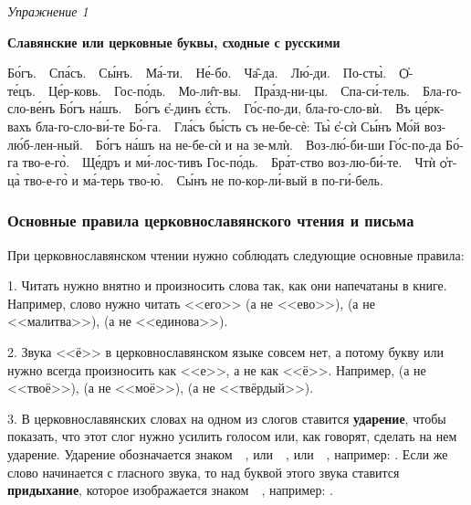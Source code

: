\documentclass[11pt,a4paper,oneside]{memoir}
\begin{document}
    \begin{flushright}
        \emph{Упражнение 1}
    \end{flushright}
    \medskip
    
    \textbf{Славянские или церковные буквы, сходные с русскими}
    
    {}
    \medskip
    
    \begin{center}
        \begin{slv}
            Бо́гъ.~\textemdash~Спа́съ.~\textemdash~Сы́нъ.~\textemdash~Ма́-ти.~\textemdash~Не́-бо.~\textemdash~Ча̑-да.~\textemdash~Лю́-ди.~\textemdash~По-сты̀.~\textemdash~Ѻ҆-те́цъ.~\textemdash~Це́р-ковь.~\textemdash~Гос-по́дь.~\textemdash~Мо-ли̑т-вы.~\textemdash~Пра́зд-ни-цы.~\textemdash~Спа-си́-тель.~\textemdash~Бла-го-сло-ве́нъ Бо́гъ на́шъ.~\textemdash~Бо́гъ є҆-динъ є҆́сть.~\textemdash~Го́с-по-ди, бла-го-сло-вѝ.~\textemdash~Въ це́рк-вахъ бла-го-сло-ви́-те Бо́-га.~\textemdash~Гла́съ бы́сть съ не-бе-сѐ: Ты̀ є҆-сѝ Сы́нъ Мо́й воз-лю́б-лен-ный.~\textemdash~Бо́гъ на́шъ на не-бе-сѝ и на зе-млѝ.~\textemdash~Воз-лю́-би-ши Го́с-по-да Бо́-га тво-е-го̀.~\textemdash~Ще́дръ и ми́-лос-тивъ Гос-по́дь.~\textemdash~Бра́т-ство воз-лю-би́-те.~\textemdash~Чтѝ ѻ҆т-ца̀ тво-е-го̀ и ма́-терь тво-ю̀.~\textemdash~Сы́нъ не по-кор-ли́-вый в по-ги́-бель.
        \end{slv}
    \end{center}


                \subsubsection{Основные правила церковнославянского чтения и письма}
                
    При церковнославянском чтении нужно соблюдать следующие основные правила:
    
    1. Читать нужно внятно и произносить слова так, как они напечатаны в книге. Например, слово {} нужно читать <<его>> (а не <<ево>>), {} (а не <<малитва>>), {} (а не <<единова>>).
    
    2. Звука <<ё>> в церковнославянском языке совсем нет, а потому букву {} или {} нужно всегда произносить как <<е>>, а не как <<ё>>. Например, {} (а не <<твоё>>), {} (а не <<моё>>), {} (а не <<твёрдый>>).
    
    3. В церковнославянских словах на одном из слогов ставится \textbf{ударение}, чтобы показать, что этот слог нужно усилить голосом или, как говорят, сделать на нем ударение. Ударение обозначается знаком~~{}, или~~{}, или~~{}, например: {}. Если же слово начинается с гласного звука, то над буквой этого звука ставится \textbf{придыхание}, которое изображается знаком~~{}, например: {}.
    
\end{document}
